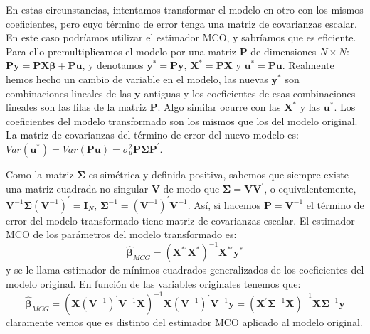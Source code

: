 En estas circunstancias, intentamos transformar el modelo en otro
con los mismos coeficientes, pero cuyo t\'ermino de error tenga una
matriz de covarianzas escalar. En este caso podr\'iamos utilizar el
estimador MCO, y sabr\'iamos que es eficiente. Para ello premultiplicamos
el modelo por una matriz $\boldsymbol{P}$ de dimensiones $N\times N$:
$\boldsymbol{P}\boldsymbol{y}=\boldsymbol{P}\boldsymbol{X}\boldsymbol{\beta}+\boldsymbol{P}\boldsymbol{u}$,
y denotamos $\boldsymbol{y}^{*}=\boldsymbol{P}\boldsymbol{y}$, $\boldsymbol{X}^{*}=\boldsymbol{P}\boldsymbol{X}$
y $\boldsymbol{u}^{*}=\boldsymbol{P}\boldsymbol{u}$. Realmente hemos
hecho un cambio de variable en el modelo, las nuevas $\boldsymbol{y}^{*}$
son combinaciones lineales de las $\boldsymbol{y}$ antiguas y los
coeficientes de esas combinaciones lineales son las filas de la matriz
$\boldsymbol{P}$. Algo similar ocurre con las $\boldsymbol{X}^{*}$
y las $\boldsymbol{u}^{*}$. Los coeficientes del modelo transformado
son los mismos que los del modelo original. La matriz de covarianzas
del t\'ermino de error del nuevo modelo es: $Var\left(\boldsymbol{u}^{*}\right)=Var\left(\boldsymbol{P}\boldsymbol{u}\right)=\sigma_{u}^{2}\boldsymbol{P}\boldsymbol{\Sigma}\boldsymbol{P}^{\prime}$.

Como la matriz $\boldsymbol{\Sigma}$ es sim\'etrica y definida positiva,
sabemos que siempre existe una matriz cuadrada no singular $\boldsymbol{V}$
de modo que $\boldsymbol{\Sigma}=\boldsymbol{V}\boldsymbol{V}^{\prime}$,
o equivalentemente, $\boldsymbol{V}^{-1}\boldsymbol{\Sigma}\left(\boldsymbol{V}^{-1}\right)^{\prime}=\boldsymbol{I}_{N}$,
$\boldsymbol{\Sigma}^{-1}=\left(\boldsymbol{V}^{-1}\right)^{\prime}\boldsymbol{V}^{-1}$.
As\'i, si hacemos $\boldsymbol{P}=\boldsymbol{V}^{-1}$ el t\'ermino de
error del modelo transformado tiene matriz de covarianzas escalar.
El estimador MCO de los par\'ametros del modelo transformado es: 
\[
\hat{\boldsymbol{\beta}}_{MCG}=\left(\boldsymbol{X}^{*\prime}\boldsymbol{X}^{*}\right)^{-1}\boldsymbol{X}^{*\prime}\boldsymbol{y}^{*}
\]
 y se le llama estimador de m\'inimos cuadrados generalizados de los
coeficientes del modelo original. En funci\'on de las variables originales
tenemos que:
\[
\hat{\boldsymbol{\beta}}_{MCG}=\left(\boldsymbol{X}\left(\boldsymbol{V}^{-1}\right)^{\prime}\boldsymbol{V}^{-1}\boldsymbol{X}\right)^{-1}\boldsymbol{X}\left(\boldsymbol{V}^{-1}\right)^{\prime}\boldsymbol{V}^{-1}\boldsymbol{y}=\left(\boldsymbol{X}^{\prime}\boldsymbol{\Sigma}^{-1}\boldsymbol{X}\right)^{-1}\boldsymbol{X}\boldsymbol{\Sigma}^{-1}\boldsymbol{y}
\]
 claramente vemos que es distinto del estimador MCO aplicado al modelo
original.


